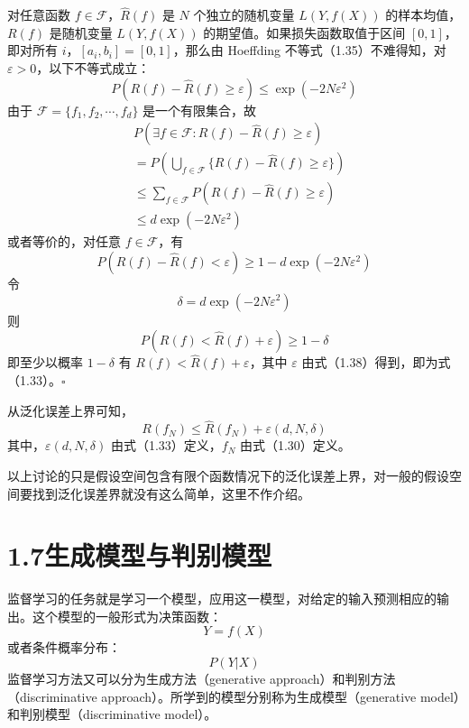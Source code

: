 \documentclass[UTF8, 12pt, fontset=fandol, oneside]{ctexart}
\begin{document}
对任意函数 $f\in\mathcal F$，$\hat R(f)$ 是 $N$ 个独立的随机变量 $L(Y,f(X))$ 的样本均值，$R(f)$ 是随机变量 $L(Y,f(X))$ 的期望值。如果损失函数取值于区间 $[0,1]$，即对所有 $i$，$[a_i,b_i]=[0,1]$，那么由 Hoeffding 不等式（1.35）不难得知，对 $\varepsilon>0$，以下不等式成立：
\begin{equation}
  P(R(f)-\hat R(f)\ge\varepsilon)\le\exp(-2N\varepsilon^2)
  \tag{1.36}
\end{equation}
由于 $\mathcal F=\{f_1,f_2,\cdots,f_d\}$ 是一个有限集合，故
\[
\begin{aligned}
  &P(\exists f\in\mathcal F:R(f)-\hat R(f)\ge\varepsilon)\\
  &=P\left(\bigcup_{f\in\mathcal F}\{R(f)-\hat R(f)\ge\varepsilon\}\right)\\
  &\le\sum_{f\in\mathcal F}P(R(f)-\hat R(f)\ge\varepsilon)\\
  &\le d\exp(-2N\varepsilon^2)
\end{aligned}
\]
或者等价的，对任意 $f\in\mathcal F$，有
\begin{equation}
  P(R(f)-\hat R(f)<\varepsilon)\ge1-d\exp(-2N\varepsilon^2)
  \tag{1.37}
\end{equation}
令
\begin{equation}
  \delta=d\exp(-2N\varepsilon^2)
  \tag{1.38}
\end{equation}
则
\[
  P(R(f)<\hat R(f)+\varepsilon)\ge1-\delta
\]
即至少以概率 $1-\delta$ 有 $R(f)<\hat R(f)+\varepsilon$，其中 $\varepsilon$ 由式（1.38）得到，即为式（1.33）。\hfill$\square$

从泛化误差上界可知，
\begin{equation}
  R(f_N)\le\hat R(f_N)+\varepsilon(d,N,\delta)
  \tag{1.39}
\end{equation}
其中，$\varepsilon(d,N,\delta)$ 由式（1.33）定义，$f_N$ 由式（1.30）定义。

以上讨论的只是假设空间包含有限个函数情况下的泛化误差上界，对一般的假设空间要找到泛化误差界就没有这么简单，这里不作介绍。

\section*{1.7\quad 生成模型与判别模型}

监督学习的任务就是学习一个模型，应用这一模型，对给定的输入预测相应的输出。这个模型的一般形式为决策函数：
\[
  Y=f(X)
\]
或者条件概率分布：
\[
  P(Y|X)
\]
监督学习方法又可以分为生成方法（generative approach）和判别方法（discriminative approach）。所学到的模型分别称为生成模型（generative model）和判别模型（discriminative model）。
\end{document}
